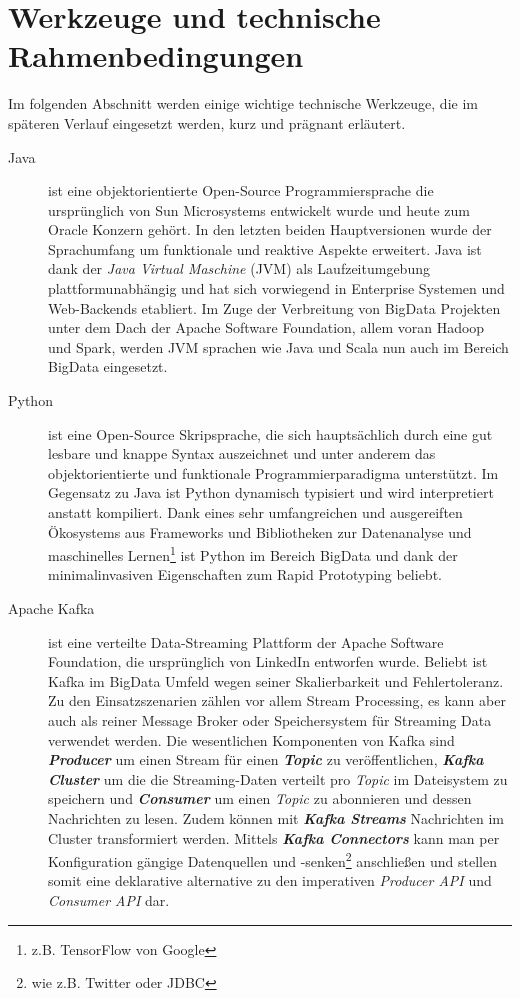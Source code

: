 \chapter{Werkzeuge und technische Rahmenbedingungen}
\label{chap:tools}
Im folgenden Abschnitt werden einige wichtige technische Werkzeuge, die im späteren Verlauf eingesetzt werden, kurz und prägnant erläutert.

\begin{description}
	\item [Java] ist eine objektorientierte Open-Source Programmiersprache die ursprünglich von Sun Microsystems entwickelt wurde und heute zum Oracle Konzern gehört. In den letzten beiden Hauptversionen wurde der Sprachumfang  um funktionale und reaktive Aspekte erweitert. Java ist dank der \textit{Java Virtual Maschine} (JVM) als Laufzeitumgebung plattformunabhängig und hat sich vorwiegend in Enterprise Systemen und Web-Backends etabliert. Im Zuge der Verbreitung von BigData Projekten unter dem Dach der Apache Software Foundation, allem voran Hadoop und Spark, werden JVM sprachen wie Java und Scala nun auch im Bereich BigData eingesetzt.
	\item [Python] ist eine Open-Source Skripsprache, die sich hauptsächlich durch eine gut lesbare und knappe Syntax auszeichnet und unter anderem das objektorientierte und funktionale Programmierparadigma unterstützt. Im Gegensatz zu Java ist Python dynamisch typisiert und wird interpretiert anstatt kompiliert. Dank eines sehr umfangreichen und ausgereiften Ökosystems aus Frameworks und Bibliotheken zur Datenanalyse und maschinelles Lernen\footnote{z.B. TensorFlow von Google} ist Python im Bereich BigData  und dank der minimalinvasiven Eigenschaften zum Rapid Prototyping beliebt.
	\item [Apache Kafka] ist eine verteilte Data-Streaming Plattform der Apache Software Foundation, die ursprünglich von LinkedIn entworfen wurde. Beliebt ist Kafka im BigData Umfeld wegen seiner Skalierbarkeit und Fehlertoleranz.  Zu den Einsatzszenarien zählen vor allem Stream Processing, es kann aber auch als reiner Message Broker oder Speichersystem für Streaming Data verwendet werden. Die wesentlichen Komponenten von Kafka sind \textbf{\textit{Producer}} um einen Stream für einen \textbf{\textit{Topic}} zu veröffentlichen, \textbf{\textit{Kafka Cluster}} um die die Streaming-Daten verteilt pro \textit{Topic} im Dateisystem zu speichern und \textbf{\textit{Consumer}} um einen \textit{Topic} zu abonnieren und dessen Nachrichten zu lesen. Zudem können mit \textbf{\textit{Kafka Streams}} Nachrichten im Cluster transformiert werden. Mittels \textbf{\textit{Kafka Connectors}} kann man per Konfiguration gängige Datenquellen und -senken\footnote{wie z.B. Twitter oder JDBC} anschließen und stellen somit eine deklarative alternative zu den imperativen \textit{Producer API} und \textit{Consumer API} dar.

\end{description}
